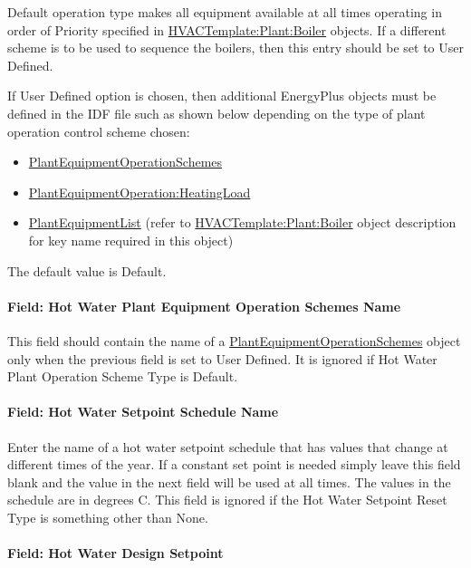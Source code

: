 Default operation type makes all equipment available at all times operating in order of Priority specified in \hyperref[hvactemplateplantboiler]{HVACTemplate:Plant:Boiler} objects. If a different scheme is to be used to sequence the boilers, then this entry should be set to User Defined.

If User Defined option is chosen, then additional EnergyPlus objects must be defined in the IDF file such as shown below depending on the type of plant operation control scheme chosen:

\begin{itemize}
\item
  \hyperref[plantequipmentoperationschemes]{PlantEquipmentOperationSchemes}
\item
  \hyperref[plantequipmentoperationheatingload]{PlantEquipmentOperation:HeatingLoad}
\item
  \hyperref[plantequipmentlist]{PlantEquipmentList} (refer to \hyperref[hvactemplateplantboiler]{HVACTemplate:Plant:Boiler} object description for key name required in this object)
\end{itemize}

The default value is Default.

\paragraph{Field: Hot Water Plant Equipment Operation Schemes Name}\label{field-hot-water-plant-equipment-operation-schemes-name}

This field should contain the name of a \hyperref[plantequipmentoperationschemes]{PlantEquipmentOperationSchemes} object only when the previous field is set to User Defined. It is ignored if Hot Water Plant Operation Scheme Type is Default.

\paragraph{Field: Hot Water Setpoint Schedule Name}\label{field-hot-water-setpoint-schedule-name}

Enter the name of a hot water setpoint schedule that has values that change at different times of the year. If a constant set point is needed simply leave this field blank and the value in the next field will be used at all times. The values in the schedule are in degrees C. This field is ignored if the Hot Water Setpoint Reset Type is something other than None.

\paragraph{Field: Hot Water Design Setpoint}\label{field-hot-water-design-setpoint}

